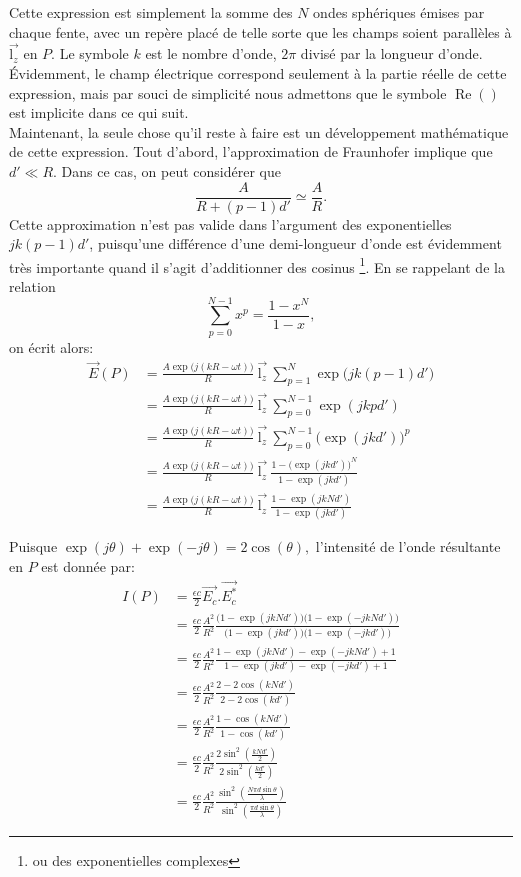 Cette expression est simplement la somme des $N$ ondes sphériques émises par chaque fente, avec un repère placé de telle sorte que les champs soient parallèles à $\overset\rightarrow{\mbox{l}_z}$ en $P$. Le symbole $k$ est le nombre d'onde, $2\pi$ divisé par la longueur d'onde. Évidemment, le champ électrique correspond seulement à la partie réelle de cette expression, mais par souci de simplicité nous admettons que le symbole $\operatorname{Re}()$ est implicite dans ce qui suit.\\

Maintenant, la seule chose qu'il reste à faire est un développement mathématique de cette expression. Tout d'abord, l'approximation de Fraunhofer implique que $d' \ll R$. Dans ce cas, on peut considérer que 
$$\frac{A}{R+(p-1)d'} \simeq \frac{A}{R}.$$ 
Cette approximation n'est pas valide dans l'argument des exponentielles $jk(p-1)d' $, puisqu'une différence d'une demi-longueur d'onde est évidemment très importante quand il s'agit d'additionner des cosinus \footnote{ou des exponentielles complexes}. 
En se rappelant de la relation
$$\sum\limits_{p=0}^{N-1} x^p=\frac{1-x^N}{1-x}, $$
on écrit alors:
\begin{align*}
\overset\rightarrow{E}(P) & = \frac{A\exp\Big(j(kR-\omega t)\Big)}{R}\:\overset\rightarrow{\mbox{l}_z}\: \sum\limits_{p=1}^N \exp\Big(jk(p-1)d'\Big) \\
& =\frac{A\exp\Big(j(kR-\omega t)\Big)}{R}\:\overset\rightarrow{\mbox{l}_z}\: \sum\limits_{p=0}^{N-1} \exp(jkpd') \\
& = \frac{A\exp\Big(j(kR-\omega t)\Big)}{R}\:\overset\rightarrow{\mbox{l}_z}\: \sum\limits_{p=0}^{N-1} {\Big(\exp(jkd')\Big)}^{p} \\
& = \frac{A\exp\Big(j(kR-\omega t)\Big)}{R}\:\overset\rightarrow{\mbox{l}_z}\: 
\frac{1-{\Big(\exp(jkd')\Big)}^N}{1-\exp(jkd')}\\
& = \frac{A\exp\Big(j(kR-\omega t)\Big)}{R}\:\overset\rightarrow{\mbox{l}_z}\: 
\frac{1-\exp(jkNd')}{1-\exp(jkd')}
\end{align*}

Puisque $\exp(j\theta)+\exp(-j\theta)= 2\cos(\theta),$ l'intensité de l'onde résultante en $P$ est donnée par:
\begin{align*}
I(P) & =\frac{\epsilon c}{2}\overset\rightarrow{E_c}.\overset\rightarrow{E_c^*} \\
& = \frac{\epsilon c}{2}\frac{A^2}{R^2}\frac{\Big(1-\exp(jkNd')\Big)\Big(1-\exp(-jkNd')\Big)}{\Big(1-\exp(jkd')\Big)\Big(1-\exp(-jkd')\Big)}\\
& = \frac{\epsilon c}{2}\frac{A^2}{R^2}\frac{1-\exp(jkNd')-\exp(-jkNd')+1}{1-\exp(jkd')-\exp(-jkd')+1}\\
& = \frac{\epsilon c}{2}\frac{A^2}{R^2}\frac{2-2\cos(kNd')}{2-2\cos(kd')}\\
& = \frac{\epsilon c}{2}\frac{A^2}{R^2}\frac{1-\cos(kNd')}{1-\cos(kd')}\\
& = \frac{\epsilon c}{2}\frac{A^2}{R^2}\frac{2\sin^2(\frac{kNd'}{2})}{2\sin^2(\frac{kd'}{2})}\\
& = \frac{\epsilon c}{2}\frac{A^2}{R^2}\frac{\sin^2(\frac{N\pi d\sin\theta}{\lambda})}{\sin^2(\frac{\pi d\sin\theta}{\lambda})}
\end{align*}

